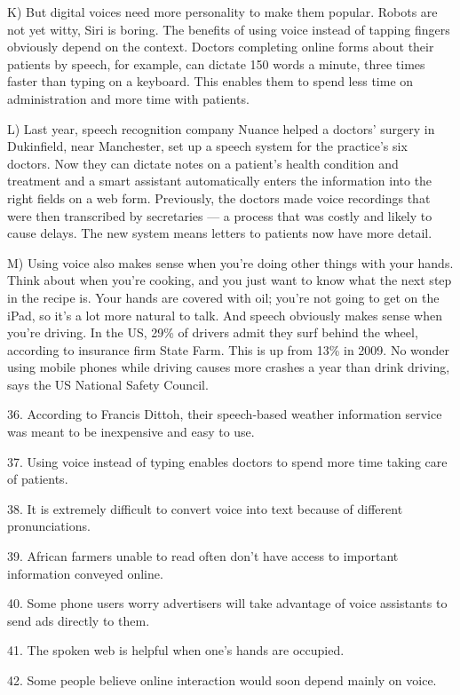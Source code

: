 \documentclass[UTF8,11pt]{ctexart}
\begin{document}
K) But digital voices need more personality to make them popular. Robots are not yet witty, Siri is boring. The benefits of using voice instead of tapping fingers obviously depend on the context. Doctors completing online forms about their patients by speech, for example, can dictate 150 words a minute, three times faster than typing on a keyboard. This enables them to spend less time on administration and more time with patients.


L) Last year, speech recognition company Nuance helped a doctors’ surgery in Dukinfield, near Manchester, set up a speech system for the practice’s six doctors. Now they can dictate notes on a patient’s health condition and treatment and a smart assistant automatically enters the information into the right fields on a web form. Previously, the doctors made voice recordings that were then transcribed by secretaries — a process that was costly and likely to cause delays. The new system means letters to patients now have more detail.


M) Using voice also makes sense when you’re doing other things with your hands. Think about when you’re cooking, and you just want to know what the next step in the recipe is. Your hands are covered with oil; you’re not going to get on the iPad, so it’s a lot more natural to talk. And speech obviously makes sense when you’re driving. In the US, 29\% of drivers admit they surf behind the wheel, according to insurance firm State Farm. This is up from 13\% in 2009. No wonder using mobile phones while driving causes more crashes a year than drink driving, says the US National Safety Council.


36. According to Francis Dittoh, their speech-based weather information service was meant to be inexpensive and easy to use.


37. Using voice instead of typing enables doctors to spend more time taking care of patients.


38. It is extremely difficult to convert voice into text because of different pronunciations.


39. African farmers unable to read often don’t have access to important information conveyed online.


40. Some phone users worry advertisers will take advantage of voice assistants to send ads directly to them.


41. The spoken web is helpful when one’s hands are occupied.


42. Some people believe online interaction would soon depend mainly on voice.
\end{document}
